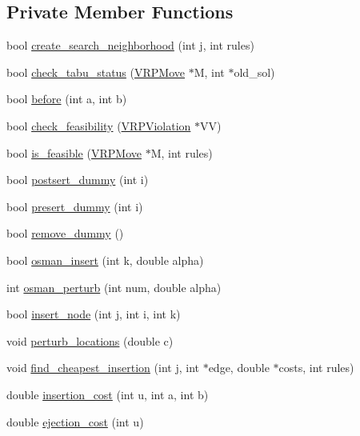 \subsection*{Private Member Functions}
\begin{DoxyCompactItemize}
\item 
bool \hyperlink{class_v_r_p_a55fa1cba5d51bd97f2e43b9caa647ecd}{create\_\-search\_\-neighborhood} (int j, int rules)
\item 
bool \hyperlink{class_v_r_p_aca16c9ae324bfa368ffab0ee117d924c}{check\_\-tabu\_\-status} (\hyperlink{class_v_r_p_move}{VRPMove} $\ast$M, int $\ast$old\_\-sol)
\item 
bool \hyperlink{class_v_r_p_a6fc078e7bedb3a2d9da0af62dbb645b2}{before} (int a, int b)
\item 
bool \hyperlink{class_v_r_p_a3e28bddbeace44a21b1128a296f956d0}{check\_\-feasibility} (\hyperlink{class_v_r_p_violation}{VRPViolation} $\ast$VV)
\item 
bool \hyperlink{class_v_r_p_a5f0fb6339cdf256c019638137ef13746}{is\_\-feasible} (\hyperlink{class_v_r_p_move}{VRPMove} $\ast$M, int rules)
\item 
bool \hyperlink{class_v_r_p_a07a2321a19c5ba2a787a093beffa1d6a}{postsert\_\-dummy} (int i)
\item 
bool \hyperlink{class_v_r_p_ae24478bfd7fcb13d077bc8109f12f7d0}{presert\_\-dummy} (int i)
\item 
bool \hyperlink{class_v_r_p_aa63c8539a72e3c407ee8cd0892ae858d}{remove\_\-dummy} ()
\item 
bool \hyperlink{class_v_r_p_a6a2e828a5fbf2830988738768107512b}{osman\_\-insert} (int k, double alpha)
\item 
int \hyperlink{class_v_r_p_ade1046ec3a60adbfb75be9e7ff98daef}{osman\_\-perturb} (int num, double alpha)
\item 
bool \hyperlink{class_v_r_p_a9b3ea7b28cecf0994b7545c48eef94b4}{insert\_\-node} (int j, int i, int k)
\item 
void \hyperlink{class_v_r_p_ac5b4714d8c880144772ddd8296c8b972}{perturb\_\-locations} (double c)
\item 
void \hyperlink{class_v_r_p_a4de3406506e3f48638a9975d303d386f}{find\_\-cheapest\_\-insertion} (int j, int $\ast$edge, double $\ast$costs, int rules)
\item 
double \hyperlink{class_v_r_p_af0f506119e3959a809d47976f5643348}{insertion\_\-cost} (int u, int a, int b)
\item 
double \hyperlink{class_v_r_p_aa876ebb6a2b91a4d6097f2aa8d4ef4e3}{ejection\_\-cost} (int u)

\end{DoxyCompactItemize}

